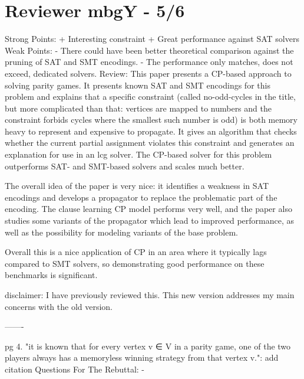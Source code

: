\documentclass{article}
\begin{document}

\section{Reviewer mbgY - 5/6}\label{rev:mbgY}

\begin{reviewer}
Strong Points: + Interesting constraint
+ Great performance against SAT solvers
Weak Points: - There could have been better theoretical comparison against the pruning of SAT and SMT encodings.
- The performance only matches, does not exceed, dedicated solvers.
Review: This paper presents a CP-based approach to solving parity games. It
presents known SAT and SMT encodings for this problem and explains
that a specific constraint (called no-odd-cycles in the title, but
more complicated than that: vertices are mapped to numbers and the
constraint forbids cycles where the smallest such number is odd) is
both memory heavy to represent and expensive to propagate. It gives an
algorithm that checks whether the current partial assignment violates
this constraint and generates an explanation for use in an lcg
solver. The CP-based solver for this problem outperforms SAT- and
SMT-based solvers and scales much better.

The overall idea of the paper is very nice: it identifies a weakness
in SAT encodings and develops a propagator to replace the problematic
part of the encoding. The clause learning CP model performs very well,
and the paper also studies some variants of the propagator which lead
to improved performance, as well as the possibility for modeling
variants of the base problem.

Overall this is a nice application of CP in an area where it typically
lags compared to SMT solvers, so demonstrating good performance on
these benchmarks is significant.

disclaimer: I have previously reviewed this. This new version
addresses my main concerns with the old version.

-------

pg 4. "it is known that for every vertex v ∈ V in a parity game, one
of the two players always has a memoryless winning strategy from that
vertex v.": add citation
Questions For The Rebuttal: -
\end{reviewer}


\end{document}
